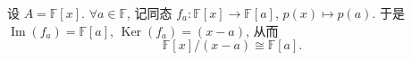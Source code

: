 \begin{example}\label{ex:evaluation-homomorphism}
设 $A=\mathbb{F}[x]$. $\forall a\in \mathbb{F}$, 记同态 $f_a\colon \mathbb{F}[x]\to \mathbb{F}[a]$, $p(x)\mapsto p(a)$.
  于是 $\operatorname{Im}(f_a)=\mathbb{F}[a]$, $\operatorname{Ker}(f_a)=(x-a)$, 从而
  \[
    \mathbb{F}[x]/(x-a)\cong \mathbb{F}[a].
  \]
\end{example}
